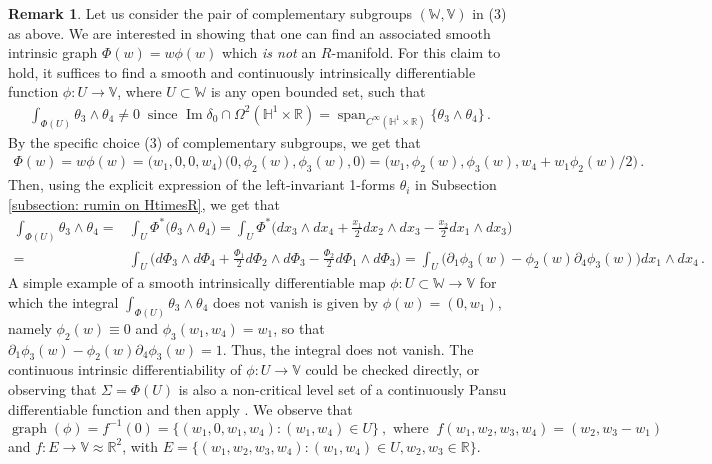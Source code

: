 \documentclass[dvipsnames]{amsart}
\theoremstyle{definition}
\newtheorem{remark}[theorem]{Remark}
\theoremstyle{definition}
\numberwithin{equation}{section}
\newcommand{\W}{\mathbb{W}}
\newcommand{\V}{\mathbb{V}}
\newcommand{\R}{\mathbb{R}}
\renewcommand{\H}{\mathbb{H}}
\begin{document}
\begin{remark}\label{remark: not an R manifold} Let us consider the pair of complementary subgroups $(\W,\V)$ in (3) as above. We are interested in showing that one can find an associated smooth intrinsic graph $\Phi(w)=w\phi(w)$ which \textit{is not} an $R$-manifold. For this claim to hold, it suffices to find a smooth and continuously intrinsically differentiable function $\phi\colon U\to\V$,
where $U\subset\W$ is any open bounded set, such that
\begin{align*}
    \int_{\Phi(U)}\theta_3\wedge\theta_4\neq 0\ \text{ since }\operatorname{Im}\delta_0\cap\Omega^2(\H^1\times\R)=\operatorname{span}_{C^\infty(\H^1\times\R)}\{\theta_3\wedge\theta_4\}\,.
\end{align*}
By the specific choice (3) of complementary subgroups, we get that
\begin{align*}
    \Phi(w)=w\phi(w)=\big(w_1,0,0,w_4\big)\,\big(0,\phi_2(w),\phi_3(w),0\big)=\big(w_1,\phi_2(w),\phi_3(w),w_4+w_1\phi_2(w)/2\big)\,.
\end{align*}
Then, using the explicit expression of the left-invariant 1-forms $\theta_i$ in Subsection \ref{subsection: rumin on HtimesR}, we get that
\begin{align*}
    \int_{\Phi(U)}\theta_3\wedge\theta_4=&\int_{U}\Phi^\ast\big(\theta_3\wedge\theta_4\big)=\int_U\Phi^\ast\big(dx_3\wedge dx_4+\tfrac{x_1}{2}dx_2\wedge dx_3-\tfrac{x_2}{2}dx_1\wedge dx_3\big)\\=&\int_U\big(d\Phi_3\wedge d\Phi_4+\tfrac{\Phi_1}{2}d\Phi_2\wedge d\Phi_3-\tfrac{\Phi_2}{2}d\Phi_1\wedge d\Phi_3\big)=\int_U\big(\partial_1\phi_3(w)-{\phi_2(w)}{}\partial_4\phi_3(w)\big)dx_1\wedge dx_4\,.
\end{align*}
A simple example of a smooth intrinsically differentiable map $\phi\colon U\subset\W\to\V$ for which the integral $\int_{\Phi(U)}\theta_3\wedge\theta_4$ does not vanish is given by $\phi(w)=(0,w_1)$, namely $\phi_2(w)\equiv 0$ and $\phi_3(w_1,w_4)=w_1$, so that $\partial_1\phi_3(w)-\phi_2(w)\partial_4\phi_3(w)=1$. Thus, the integral does not vanish. 
The continuous intrinsic differentiability of $\phi\colon U\to\V$ could be checked directly, or observing that $\Sigma=\Phi(U)$ is also a non-critical level set of a continuously Pansu differentiable function and then apply \cite[Theorem~4.3.7]{CorniPhD}. We observe that
\[
\operatorname{graph}(\phi)=
f^{-1}(0)=\{(w_1,0,w_1,w_4):(w_1,w_4)\in U\}\ , \text{ where }\ f(w_1,w_2,w_3,w_4)=(w_2,w_3-w_1)
\]
and $f:E\to\V\approx\R^2$, with $E=\{(w_1,w_2,w_3,w_4): (w_1,w_4)\in U, w_2,w_3\in\R\}$.
\end{remark}
\end{document}
